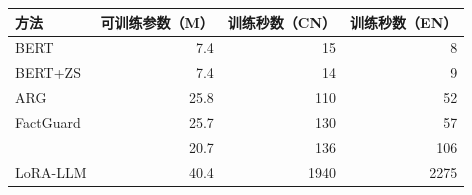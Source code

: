 \begin{tabular}{lrrr}
\toprule
方法 & 可训练参数（M） & 训练秒数（CN） & 训练秒数（EN） \\
\midrule
BERT & 7.4 & 15 & 8 \\
BERT+ZS & 7.4 & 14 & 9 \\
ARG & 25.8 & 110 & 52 \\
FactGuard & 25.7 & 130 & 57 \\
\method{} & 20.7 & 136 & 106 \\
LoRA-LLM & 40.4 & 1940 & 2275 \\
\bottomrule
\end{tabular}
